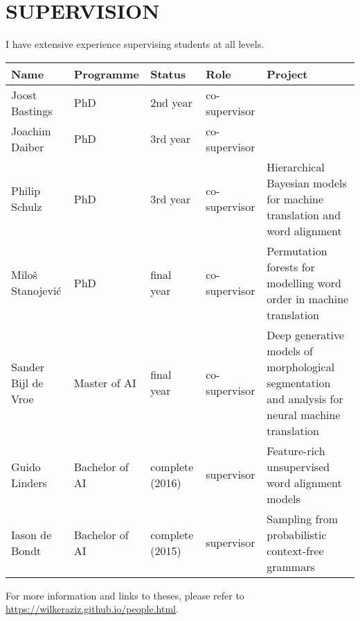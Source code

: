 \section*{SUPERVISION}

I have extensive experience supervising students at all levels. 

\begin{tabular}{l l p{2cm} l p{6cm}}
\bf Name & \bf Programme & \bf Status & \bf Role & \bf Project \\ \hline
Joost Bastings & PhD & 2nd year & co-supervisor & \\
Joachim Daiber & PhD & 3rd year & co-supervisor & \\
Philip Schulz  & PhD & 3rd year & co-supervisor & Hierarchical Bayesian models for machine translation and word alignment \\
Milo\v{s} Stanojevi\'c & PhD & final year & co-supervisor & Permutation forests for modelling word order in machine translation \\
Sander Bijl de Vroe & Master of AI & final year & co-supervisor & Deep generative models of morphological segmentation and analysis for neural machine translation\\
Guido Linders & Bachelor of AI & complete (2016) & supervisor & Feature-rich unsupervised word alignment models \\
Iason de Bondt & Bachelor of AI & complete (2015) & supervisor & Sampling from probabilistic context-free grammars\\ \hline
\end{tabular}
For more information and links to theses, please refer to \url{https://wilkeraziz.github.io/people.html}.








